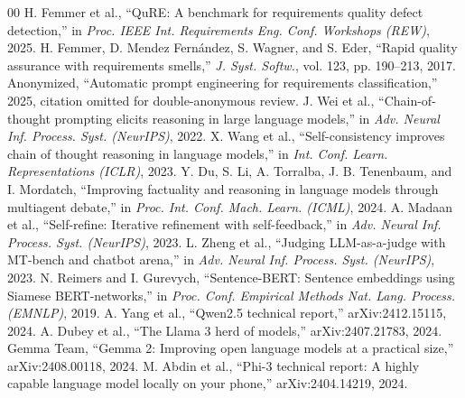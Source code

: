 \documentclass[10pt,conference]{IEEEtran}
\begin{document}
\begin{thebibliography}{00}
 H. Femmer et al., ``QuRE: A benchmark for requirements quality defect detection,'' in \emph{Proc. IEEE Int. Requirements Eng. Conf. Workshops (REW)}, 2025.
 H. Femmer, D. Mendez Fern\'andez, S. Wagner, and S. Eder, ``Rapid quality assurance with requirements smells,'' \emph{J. Syst. Softw.}, vol. 123, pp. 190--213, 2017.
 Anonymized, ``Automatic prompt engineering for requirements classification,'' 2025, citation omitted for double-anonymous review.
 J. Wei et al., ``Chain-of-thought prompting elicits reasoning in large language models,'' in \emph{Adv. Neural Inf. Process. Syst. (NeurIPS)}, 2022.
 X. Wang et al., ``Self-consistency improves chain of thought reasoning in language models,'' in \emph{Int. Conf. Learn. Representations (ICLR)}, 2023.
 Y. Du, S. Li, A. Torralba, J. B. Tenenbaum, and I. Mordatch, ``Improving factuality and reasoning in language models through multiagent debate,'' in \emph{Proc. Int. Conf. Mach. Learn. (ICML)}, 2024.
 A. Madaan et al., ``Self-refine: Iterative refinement with self-feedback,'' in \emph{Adv. Neural Inf. Process. Syst. (NeurIPS)}, 2023.
 L. Zheng et al., ``Judging LLM-as-a-judge with MT-bench and chatbot arena,'' in \emph{Adv. Neural Inf. Process. Syst. (NeurIPS)}, 2023.
 N. Reimers and I. Gurevych, ``Sentence-BERT: Sentence embeddings using Siamese BERT-networks,'' in \emph{Proc. Conf. Empirical Methods Nat. Lang. Process. (EMNLP)}, 2019.
 A. Yang et al., ``Qwen2.5 technical report,'' arXiv:2412.15115, 2024.
 A. Dubey et al., ``The Llama 3 herd of models,'' arXiv:2407.21783, 2024.
 Gemma Team, ``Gemma 2: Improving open language models at a practical size,'' arXiv:2408.00118, 2024.
 M. Abdin et al., ``Phi-3 technical report: A highly capable language model locally on your phone,'' arXiv:2404.14219, 2024.
\end{thebibliography}
\end{document}
